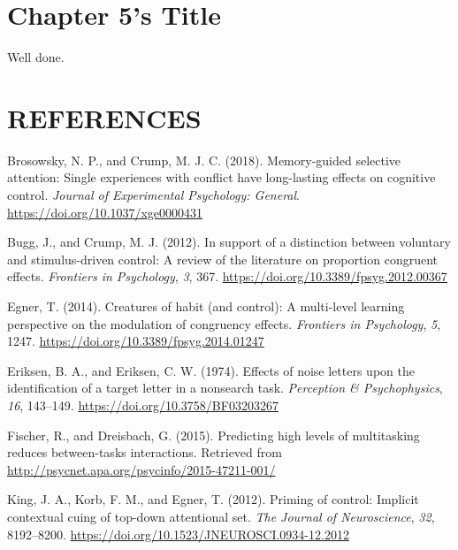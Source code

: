 \documentclass[]{DissertateCUNY}
\begin{document}
\chapter{Chapter 5's Title}

Well done.

\FloatBarrier
\newpage

 \fancyhead[R]{\thepage} \fancyfoot[C]{}

\chapter*{REFERENCES}

\setlength{\parindent}{-0.5in} \setlength{\leftskip}{0.5in}
\setlength{\parskip}{6pt} \noindent

\hypertarget{refs}{}
\hypertarget{ref-brosowsky_memory-guided_2018}{}
Brosowsky, N. P., and Crump, M. J. C. (2018). Memory-guided selective
attention: Single experiences with conflict have long-lasting effects on
cognitive control. \emph{Journal of Experimental Psychology: General}.
\url{https://doi.org/10.1037/xge0000431}

\hypertarget{ref-bugg_support_2012}{}
Bugg, J., and Crump, M. J. (2012). In support of a distinction between
voluntary and stimulus-driven control: A review of the literature on
proportion congruent effects. \emph{Frontiers in Psychology}, \emph{3},
367. \url{https://doi.org/10.3389/fpsyg.2012.00367}

\hypertarget{ref-egner_creatures_2014}{}
Egner, T. (2014). Creatures of habit (and control): A multi-level
learning perspective on the modulation of congruency effects.
\emph{Frontiers in Psychology}, \emph{5}, 1247.
\url{https://doi.org/10.3389/fpsyg.2014.01247}

\hypertarget{ref-eriksen_effects_1974}{}
Eriksen, B. A., and Eriksen, C. W. (1974). Effects of noise letters upon
the identification of a target letter in a nonsearch task.
\emph{Perception \& Psychophysics}, \emph{16}, 143--149.
\url{https://doi.org/10.3758/BF03203267}

\hypertarget{ref-fischer_predicting_2015}{}
Fischer, R., and Dreisbach, G. (2015). Predicting high levels of
multitasking reduces between-tasks interactions. Retrieved from
\url{http://psycnet.apa.org/psycinfo/2015-47211-001/}

\hypertarget{ref-king_priming_2012}{}
King, J. A., Korb, F. M., and Egner, T. (2012). Priming of control:
Implicit contextual cuing of top-down attentional set. \emph{The Journal
of Neuroscience}, \emph{32}, 8192--8200.
\url{https://doi.org/10.1523/JNEUROSCI.0934-12.2012}
\end{document}
